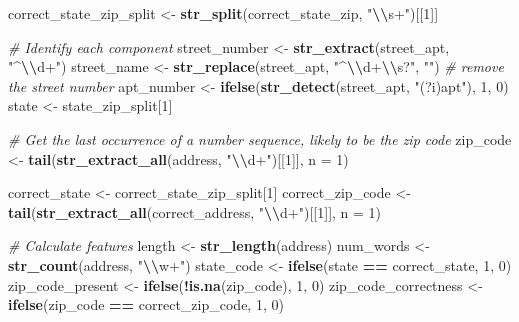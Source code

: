 \documentclass[
]{book}
\newenvironment{Shaded}{\begin{snugshade}}{\end{snugshade}}
\newcommand{\AttributeTok}[1]{\textcolor[rgb]{0.13,0.29,0.53}{#1}}
\newcommand{\CommentTok}[1]{\textcolor[rgb]{0.56,0.35,0.01}{\textit{#1}}}
\newcommand{\DecValTok}[1]{\textcolor[rgb]{0.00,0.00,0.81}{#1}}
\newcommand{\FunctionTok}[1]{\textcolor[rgb]{0.13,0.29,0.53}{\textbf{#1}}}
\newcommand{\NormalTok}[1]{#1}
\newcommand{\OtherTok}[1]{\textcolor[rgb]{0.56,0.35,0.01}{#1}}
\newcommand{\SpecialCharTok}[1]{\textcolor[rgb]{0.81,0.36,0.00}{\textbf{#1}}}
\newcommand{\StringTok}[1]{\textcolor[rgb]{0.31,0.60,0.02}{#1}}
\begin{document}
\begin{Shaded}
\begin{Highlighting}[]
\NormalTok{  correct\_state\_zip\_split }\OtherTok{\textless{}{-}} \FunctionTok{str\_split}\NormalTok{(correct\_state\_zip, }\StringTok{"}\SpecialCharTok{\textbackslash{}\textbackslash{}}\StringTok{s+"}\NormalTok{)[[}\DecValTok{1}\NormalTok{]]}
  
  \CommentTok{\# Identify each component}
\NormalTok{  street\_number }\OtherTok{\textless{}{-}} \FunctionTok{str\_extract}\NormalTok{(street\_apt, }\StringTok{"\^{}}\SpecialCharTok{\textbackslash{}\textbackslash{}}\StringTok{d+"}\NormalTok{)}
\NormalTok{  street\_name }\OtherTok{\textless{}{-}} \FunctionTok{str\_replace}\NormalTok{(street\_apt, }\StringTok{"\^{}}\SpecialCharTok{\textbackslash{}\textbackslash{}}\StringTok{d+}\SpecialCharTok{\textbackslash{}\textbackslash{}}\StringTok{s?"}\NormalTok{, }\StringTok{""}\NormalTok{) }\CommentTok{\# remove the street number}
\NormalTok{  apt\_number }\OtherTok{\textless{}{-}} \FunctionTok{ifelse}\NormalTok{(}\FunctionTok{str\_detect}\NormalTok{(street\_apt, }\StringTok{"(?i)apt"}\NormalTok{), }\DecValTok{1}\NormalTok{, }\DecValTok{0}\NormalTok{)}
\NormalTok{  state }\OtherTok{\textless{}{-}}\NormalTok{ state\_zip\_split[}\DecValTok{1}\NormalTok{]}
  
  \CommentTok{\# Get the last occurrence of a number sequence, likely to be the zip code}
\NormalTok{  zip\_code }\OtherTok{\textless{}{-}} \FunctionTok{tail}\NormalTok{(}\FunctionTok{str\_extract\_all}\NormalTok{(address, }\StringTok{"}\SpecialCharTok{\textbackslash{}\textbackslash{}}\StringTok{d+"}\NormalTok{)[[}\DecValTok{1}\NormalTok{]], }\AttributeTok{n =} \DecValTok{1}\NormalTok{)}
  
\NormalTok{  correct\_state }\OtherTok{\textless{}{-}}\NormalTok{ correct\_state\_zip\_split[}\DecValTok{1}\NormalTok{]}
\NormalTok{  correct\_zip\_code }\OtherTok{\textless{}{-}} \FunctionTok{tail}\NormalTok{(}\FunctionTok{str\_extract\_all}\NormalTok{(correct\_address, }\StringTok{"}\SpecialCharTok{\textbackslash{}\textbackslash{}}\StringTok{d+"}\NormalTok{)[[}\DecValTok{1}\NormalTok{]], }\AttributeTok{n =} \DecValTok{1}\NormalTok{)}
  
  \CommentTok{\# Calculate features}
\NormalTok{  length }\OtherTok{\textless{}{-}} \FunctionTok{str\_length}\NormalTok{(address)}
\NormalTok{  num\_words }\OtherTok{\textless{}{-}} \FunctionTok{str\_count}\NormalTok{(address, }\StringTok{"}\SpecialCharTok{\textbackslash{}\textbackslash{}}\StringTok{w+"}\NormalTok{)}
\NormalTok{  state\_code }\OtherTok{\textless{}{-}} \FunctionTok{ifelse}\NormalTok{(state }\SpecialCharTok{==}\NormalTok{ correct\_state, }\DecValTok{1}\NormalTok{, }\DecValTok{0}\NormalTok{)}
\NormalTok{  zip\_code\_present }\OtherTok{\textless{}{-}} \FunctionTok{ifelse}\NormalTok{(}\SpecialCharTok{!}\FunctionTok{is.na}\NormalTok{(zip\_code), }\DecValTok{1}\NormalTok{, }\DecValTok{0}\NormalTok{)}
\NormalTok{  zip\_code\_correctness }\OtherTok{\textless{}{-}} \FunctionTok{ifelse}\NormalTok{(zip\_code }\SpecialCharTok{==}\NormalTok{ correct\_zip\_code, }\DecValTok{1}\NormalTok{, }\DecValTok{0}\NormalTok{)}
  

\end{Highlighting}
\end{Shaded}
\end{document}
